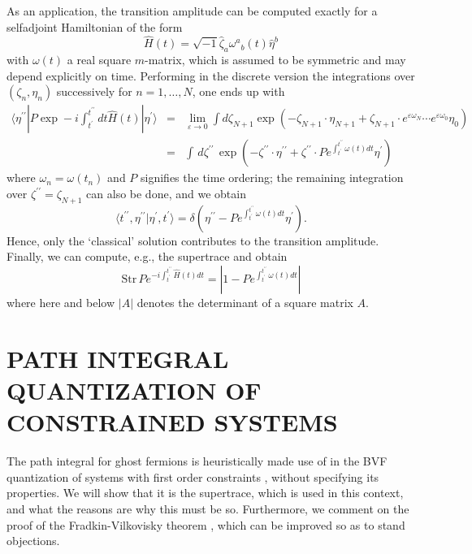 \documentclass[a4paper,10pt]{article}
\begin{document}
As an application, the transition amplitude can be computed exactly for a selfadjoint 
Hamiltonian of the form
\begin{equation}
\hat{H}(t)=\sqrt{-1}\hat{\zeta}_a\omega^a{}_b(t)\hat{\eta}^b
\end{equation}
with $\omega(t)$ a real square $m$-matrix, which is assumed to be symmetric and may 
depend explicitly on time. Performing in the discrete version the integrations over $(\zeta_n,\eta_n)$ successively for $n=1,\ldots,N$, one ends up with
\begin{eqnarray}\nonumber
\langle\eta^{\prime\prime}|P\exp-
i\int_{t^{\prime}}^{t^{\prime\prime}}dt\hat{H}(t)|\eta^{\prime}\rangle&=&
\lim_{\varepsilon \rightarrow 0}\int d\zeta_{N+1}\exp\left(-
\zeta_{N+1}\cdot\eta_{N+1}+\zeta_{N+1}\cdot e^{\varepsilon\omega_N}\cdots 
e^{\varepsilon\omega_0}
\eta_0\right)\\
&=&\int\,d\zeta^{\prime\prime}\,\exp\left(-
\zeta^{\prime\prime}\cdot\eta^{\prime\prime}+\zeta^{\prime\prime}\cdot 
Pe^{\int_{t^{\prime}}^{t^{\prime\prime}}\omega(t)dt}\eta^{\prime}\right)
\end{eqnarray}
where $\omega_n=\omega(t_n)$ and $P$ signifies the time ordering; the remaining integration over 
$\zeta^{\prime\prime}=\zeta_{N+1}$ can also be done, and we obtain
\begin{equation}
\langle t^{\prime\prime},\eta^{\prime\prime}|\eta^{\prime}
,t^{\prime}\rangle=\delta(\eta^{\prime\prime}-
Pe^{\int_{t^{\prime}}^{t^{\prime\prime}}\omega(t)dt}\eta^{\prime}).
\end{equation}
Hence, only the `classical' solution contributes to the transition amplitude. Finally, we 
can compute, e.g., the supertrace and obtain 
\begin{equation}
\mathrm{Str}\,P e^{-i\int_{t^{\prime}}^{t^{\prime\prime}}\hat{H}(t)dt}=\left|1-
Pe^{\int_{t^{\prime}}^{t^{\prime\prime}}\omega(t)dt}\right|
\end{equation}
where here and below $|A|$ denotes the determinant of a square matrix $A$.

\section{PATH INTEGRAL QUANTIZATION OF CONSTRAINED SYSTEMS}

The path integral for ghost fermions is heuristically made use of in the BVF 
quantization of systems with first order constraints \cite{Frad 75,Henn 92}, without 
specifying its properties. We will show that it is the supertrace, which is used in this 
context, and what the reasons are why this must be so. Furthermore, we comment on the 
proof of the 
Fradkin-Vilkovisky theorem \cite{Bata 77}, which can be improved so as to stand 
objections. 
\end{document}
